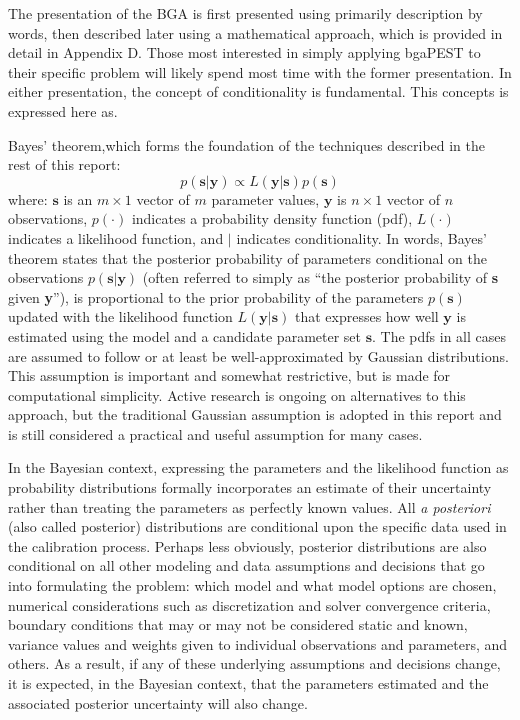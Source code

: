 \documentclass[11pt,oneside,onecolumn]{usgsreport}
\begin{document}
\begin{multicols}{2}
The presentation of the BGA is first presented using primarily description
by words, then described later using a mathematical approach, which
is provided in detail in Appendix D. Those most interested in simply
applying bgaPEST to their specific problem will likely spend most
time with the former presentation. In either presentation,  the concept
of conditionality is fundamental. This concepts is expressed here
as. 

Bayes' theorem,which forms the foundation of the techniques described
in the rest of this report:
\begin{equation}
p\left(\mathbf{s}|\mathbf{y}\right)\propto L\left(\mathbf{y}|\mathbf{s}\right)p\left(\mathbf{s}\right)\label{eq:bayes1}
\end{equation}
where: $\mathbf{s}$ is an $m\times1$ vector of $m$ parameter values,
$\mathbf{y}$ is $n\times1$ vector of $n$ observations, $p\left(\cdot\right)$
indicates a probability density function (pdf), $L\left(\cdot\right)$
indicates a likelihood function, and $|$ indicates conditionality.
In words, Bayes' theorem states that the posterior probability of
parameters conditional on the observations $p\left(\mathbf{s}|\mathbf{y}\right)$
(often referred to simply as ``the posterior probability of \textbf{s}
given \textbf{y}''), is proportional to the prior probability of
the parameters $p\left(\mathbf{s}\right)$ updated with the likelihood
function $L\left(\mathbf{y}|\mathbf{s}\right)$ that expresses how
well $\mathbf{y}$ is estimated using the model and a candidate parameter
set $\mathbf{s}$. The pdfs in all cases are assumed to follow or
at least be well-approximated by Gaussian distributions. This assumption
is important and somewhat restrictive, but is made for computational
simplicity. Active research is ongoing on alternatives to this approach,
but the traditional Gaussian assumption is adopted in this report
and is still considered a practical and useful assumption for many
cases.

In the Bayesian context, expressing the parameters and the likelihood
function as probability distributions formally incorporates an estimate
of their uncertainty rather than treating the parameters as perfectly
known values. All \emph{a posteriori }(also called posterior) distributions
are conditional upon the specific data used in the calibration process.
Perhaps less obviously, posterior distributions are also conditional
on all other modeling and data assumptions and decisions that go into
formulating the problem: which model and what model options are chosen,
numerical considerations such as discretization and solver convergence
criteria, boundary conditions that may or may not be considered static
and known, variance values and weights given to individual observations
and parameters, and others. As a result, if any of these underlying
assumptions and decisions change, it is expected, in the Bayesian
context, that the parameters estimated and the associated posterior
uncertainty will also change. 


\end{multicols}
\end{document}
